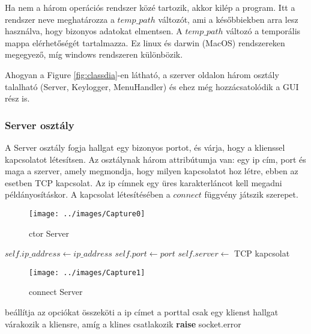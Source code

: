 \documentclass[a4paper, 11pt]{article}
\begin{document}
\noindent Ha nem a három operációs rendszer közé tartozik, akkor kilép a program. Itt a rendszer neve meghatározza a $temp\_path$ változót, ami a későbbiekben arra lesz használva, hogy bizonyos adatokat elmentsen. A $temp\_path$ változó a temporális mappa elérhetőségét tartalmazza. Ez linux és darwin (MacOS) rendszereken megegyező, míg windows rendszeren különbözik.

Ahogyan a Figure \ref{fig:classdia}-en látható, a szerver oldalon három osztály talalható (Server, Keylogger, MenuHandler) és ehez még hozzácsatolódik a GUI rész is.

\subsubsection{Server osztály}\label{subsubsec:serverclass}
A Server osztály fogja hallgat egy bizonyos portot, és várja, hogy a klienssel kapcsolatot létesítsen. Az osztálynak három attribútumja van: egy ip cím, port és maga a szerver, amely megmondja, hogy milyen kapcsolatot hoz létre, ebben az esetben TCP kapcsolat. Az ip címnek egy üres karakterláncot kell megadni példányosításkor. A kapcsolat létesítésében a $connect$ függvény játszik szerepet.
\begin{figure}[H]
\centering
\texttt{[image: ../images/Capture0]}
\caption{ctor Server}
\label{fig:ctorserver}
\end{figure}

\begin{algorithmic}[H]
	\State $self.ip\_address \gets ip\_address$
	\State $self.port \gets port$
	\State $self.server \gets$ TCP kapcsolat
\EndFunction
\end{algorithmic}

\begin{figure}[H]
\centering
\texttt{[image: ../images/Capture1]}
\caption{connect Server}
\label{fig:connect}
\end{figure}

\begin{algorithmic}[H]
	\State beállítja az opciókat
	\State összeköti a ip címet a porttal
	\State csak egy klienst hallgat
	\try
		\State várakozik a kliensre, amíg a klines csatlakozik
		\State \textbf{raise} socket.error
	\endtry
\EndFunction
\end{algorithmic}
\end{document}
